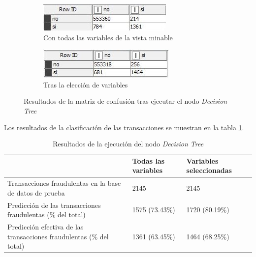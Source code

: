 \begin{figure} [!h]
	\centering
	\begin{subfigure}[b]{0.49\linewidth}
		\includegraphics[width=\linewidth]{"figuras/Ray/Arbol de decision/Todas las variables/Matriz de confusion del nodo Score de arbol"}
		\caption{Con todas las variables de la vista minable}
		\label{fig:matriz-score-de-arbol}
	\end{subfigure}
\hfill
\begin{subfigure}[b]{0.49\linewidth}
	\includegraphics[width=\linewidth]{"figuras/Ray/Arbol de decision/Grupo de datos Mejores Resultados/Matriz de confusion del nodo Score de arbol"}
	\caption{Tras la elección de variables}
	\label{fig:matriz-dectree-best-}
\end{subfigure}
\caption{Resultados de la matriz de confusión tras ejecutar el nodo \textit{Decision Tree}}
\label{fig:matriz-dec-tree}
\end{figure}

Los resultados de la clasificación de las transacciones se muestran en la tabla \ref{tabla:res-desicion-tree}.

\begin{table} [H]
	\centering
	\begin{tabular}{p{6cm} | l | l}
		\toprule
		 & Todas las variables & Variables seleccionadas \\
		 \midrule
		Transacciones fraudulentas en la base de datos de prueba &	2145 & 2145 \\
		\hline
		Predicción de las transacciones fraudulentas (\% del total) &	1575 (73.43\%) & 1720 (80.19\%)\\
		\hline
		Predicción efectiva de las transacciones fraudulentas (\% del total)	& 1361 (63.45\%) & 1464 (68.25\%)\\
		\bottomrule	
	\end{tabular}
	\caption{Resultados de la ejecución del nodo \textit{Decision Tree}}
	\label{tabla:res-desicion-tree}
\end{table}

